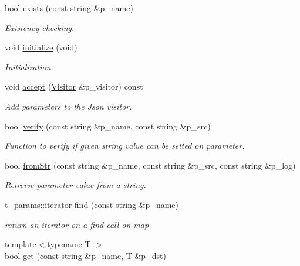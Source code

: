 \begin{DoxyCompactItemize}
bool \hyperlink{classxtd_1_1servers_1_1param_1_1Handler_a0fcbef276a961d96584354588fc3bfcf}{exists} (const string \&p\+\_\+name)
\begin{DoxyCompactList}\small\item\em Existency checking. \end{DoxyCompactList}\item 
void \hyperlink{classxtd_1_1servers_1_1param_1_1Handler_a9533d788448e6bfdaf1c0f439a9f7b05}{initialize} (void)
\begin{DoxyCompactList}\small\item\em Initialization. \end{DoxyCompactList}\item 
void \hyperlink{classxtd_1_1servers_1_1param_1_1Handler_aba6e8d983f28617b3168b60cf6464926}{accept} (\hyperlink{classxtd_1_1servers_1_1param_1_1Visitor}{Visitor} \&p\+\_\+visitor) const 
\begin{DoxyCompactList}\small\item\em Add parameters to the Json visitor. \end{DoxyCompactList}\item 
bool \hyperlink{classxtd_1_1servers_1_1param_1_1Handler_aa2b60f898a67bd55c4289686591a2f3b}{verify} (const string \&p\+\_\+name, const string \&p\+\_\+src)
\begin{DoxyCompactList}\small\item\em Function to verify if given string value can be setted on parameter. \end{DoxyCompactList}\item 
bool \hyperlink{classxtd_1_1servers_1_1param_1_1Handler_ab3a53b8db70cf25c3e1de6425d876c37}{from\+Str} (const string \&p\+\_\+name, const string \&p\+\_\+src, const string \&p\+\_\+log)
\begin{DoxyCompactList}\small\item\em Retreive parameter value from a string. \end{DoxyCompactList}\item 
t\+\_\+params\+::iterator \hyperlink{classxtd_1_1servers_1_1param_1_1Handler_a66465c7a1ee0978f7558d55bfd8bd583}{find} (const string \&p\+\_\+name)
\begin{DoxyCompactList}\small\item\em return an iterator on a find call on map \end{DoxyCompactList}\item 
{\footnotesize template$<$typename T $>$ }\\bool \hyperlink{classxtd_1_1servers_1_1param_1_1Handler_a0f767078fd33fec21e1677d0a0195d8e}{get} (const string \&p\+\_\+name, T \&p\+\_\+dst)

\end{DoxyCompactItemize}
